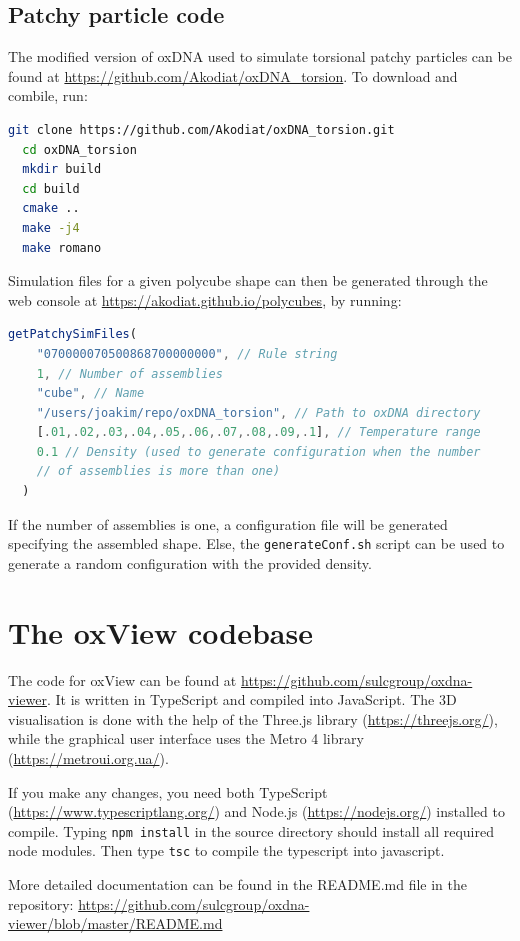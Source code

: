 \section{Patchy particle code}

The modified version of oxDNA used to simulate torsional patchy particles can be found at \url{https://github.com/Akodiat/oxDNA_torsion}. To download and combile, run:

\begin{lstlisting}[language=bash]
  git clone https://github.com/Akodiat/oxDNA_torsion.git
  cd oxDNA_torsion
  mkdir build
  cd build
  cmake ..
  make -j4
  make romano
\end{lstlisting}

Simulation files for a given polycube shape can then be generated through the web console at \url{https://akodiat.github.io/polycubes}, by running:

\begin{lstlisting}[language=JavaScript]
  getPatchySimFiles(
    "070000070500868700000000", // Rule string
    1, // Number of assemblies
    "cube", // Name
    "/users/joakim/repo/oxDNA_torsion", // Path to oxDNA directory
    [.01,.02,.03,.04,.05,.06,.07,.08,.09,.1], // Temperature range
    0.1 // Density (used to generate configuration when the number
    // of assemblies is more than one)
  )
\end{lstlisting}

If the number of assemblies is one, a configuration file will be generated specifying the assembled shape. Else, the \texttt{generateConf.sh} script can be used to generate a random configuration with the provided density.


\chapter{The oxView codebase}

The code for oxView can be found at \url{https://github.com/sulcgroup/oxdna-viewer}. It is written in TypeScript and compiled into JavaScript. The 3D visualisation is done with the help of the Three.js library (\url{https://threejs.org/}), while the graphical user interface uses the Metro 4 library (\url{https://metroui.org.ua/}). 

If you make any changes, you need both TypeScript (\url{https://www.typescriptlang.org/}) and Node.js (\url{https://nodejs.org/}) installed to compile. Typing \verb|npm install| in the source directory should install all required node modules. Then type \verb|tsc| to compile the typescript into javascript. 

More detailed documentation can be found in the README.md file in the repository: \url{https://github.com/sulcgroup/oxdna-viewer/blob/master/README.md}

\minitoc

